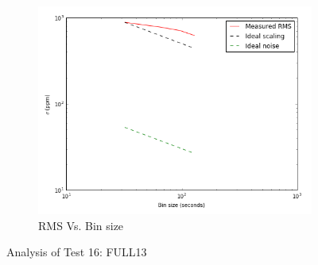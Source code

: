 \documentclass[conference]{IEEEtran}
\begin{document}
\begin{figure}[H]
    \begin{subfigure}{3}
        \includegraphics[scale=0.6]{rms_test16}
        \caption{RMS Vs. Bin size}
    \end{subfigure}
    \caption{Analysis of Test 16: FULL13}
\end{figure}
\end{document}
